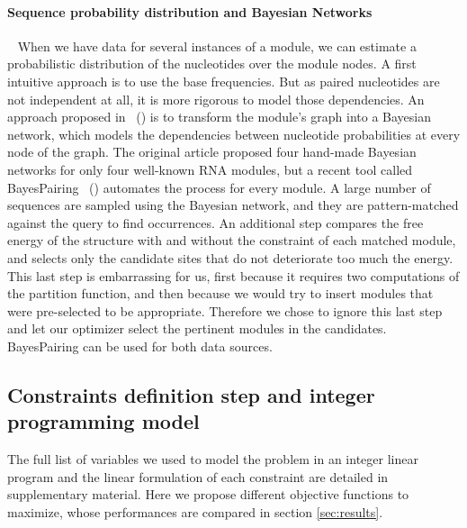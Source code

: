 \documentclass{bioinfo}
\begin{document}
\begin{methods}
\paragraph{Sequence probability distribution and Bayesian Networks} ~ When we have data for several instances of a module, we can estimate a probabilistic distribution of the nucleotides over the module nodes. A first intuitive approach is to use the base frequencies. But as paired nucleotides are not independent at all, it is more rigorous to model those dependencies. An approach proposed in ~(\citealp{cruz2011sequence}) is to transform the module's graph into a Bayesian network, which models the dependencies between nucleotide probabilities at every node of the graph. The original article proposed four hand-made Bayesian networks for only four well-known RNA modules, but a recent tool called BayesPairing ~(\citealp{sarrazin2019automated}) automates the process for every module. A large number of sequences are sampled using the Bayesian network, and they are pattern-matched against the query to find occurrences. An additional step compares the free energy of the structure with and without the constraint of each matched module, and selects only the candidate sites that do not deteriorate too much the energy. This last step is embarrassing for us, first because it requires two computations of the partition function, and then because we would try to insert modules that were pre-selected to be appropriate. Therefore we chose to ignore this last step and let our optimizer select the pertinent modules in the candidates. BayesPairing can be used for both data sources.


\subsection{Constraints definition step and integer programming model} \label{sec:ip}
The full list of variables we used to model the problem in an integer linear program and the linear formulation of each constraint are detailed in supplementary material. Here we propose different objective functions to maximize, whose performances are compared in section \ref{sec:results}.


\end{methods}
\end{document}
